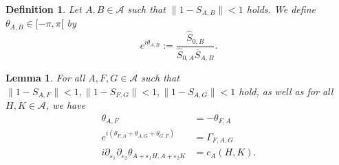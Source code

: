 \documentclass[a4paper,11pt]{article}
\newtheorem{de}{Definition}
\newtheorem{lem}{Lemma}
\begin{document}
\begin{de}
Let \(A,B \in\mathcal{A}\) such that \(\|1-S_{A,B}\|<1\) holds. We define \(\theta_{A,B}\in [-\pi,\pi[\) by
\begin{equation}\label{def theta}
e^{i \theta_{A,B}}:=\frac{\hat{S}_{0,B}}{\hat{S}_{0,A}\overline{S}_{A,B}}.
\end{equation}
\end{de}


\begin{lem}
For all \(A,F,G\in\mathcal{A}\) such that \(\|1-S_{A,F}\|<1, \|1-S_{F,G}\|<1, \|1-S_{A,G}\|<1\) hold, as well as for all \(H,K\in \mathcal{A}\), we have
\begin{align}\label{theta antisym}
\theta_{A,F}&=-\theta_{F,A}\\\label{theta gamma}
e^{i(\theta_{F,A}+\theta_{A,G}+\theta_{G,F})}&=\Gamma_{F,A,G}\\\label{theta c}
i\partial_{\varepsilon_1}\partial_{\varepsilon_2} \theta_{A+\varepsilon_1 H,A+\varepsilon_2 K}&=c_A(H,K).
\end{align}
\end{lem}
\end{document}
